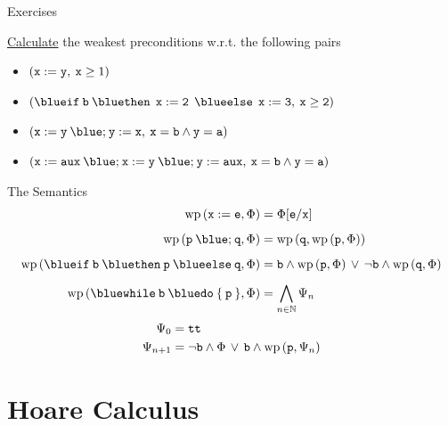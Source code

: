 \documentclass{beamer}
\begin{document}
\begin{frame}{Exercises}
        
        \alert{\underline{Calculate}} the weakest preconditions w.r.t. the following pairs
        \\[7pt]
        \begin{itemize}
                \item $(\mathtt{x := y}, \>  \mathtt{x} \geq 1)$
                        \\[7pt]
                \item $(\prog{{\blue if} \>  b \> {\blue then} \> \> 
                        x:=2 \> \> {\blue else} \> \> x:= 3}, \> \prog{x \geq 2})$
                        \\[7pt]
                \item $(\prog{x:= y \> {\blue ;} \> y := x}, \> \prog{ x = b \wedge y = a })$
                        \\[7pt]
                \item $(\prog{x:= aux \> {\blue ;} \> 
                        x:= y \> {\blue ;} \> y := aux}, \> \prog{ x = b \wedge y = a })$
        \end{itemize}
\end{frame}

\begin{frame}{The Semantics}
        \begin{align*}
                \mathrm{wp}\,(\prog{x : = e}, \Phi) & = \Phi[\prog{e}/\prog{x}] \\[5pt]
                \mathrm{wp}\,(\prog{p} \> {\blue ;} \> \prog{q}, \Phi) & 
                = \mathrm{wp} \, (\prog{q}, \mathrm{wp} \, (\prog{p}, \Phi))  \\[5pt]
                \mathrm{wp}\,({\mathtt{{\blue if} \> b \> {\blue then} \> p \> {\blue else} \> q}}, \Phi)
                & 
                =
                \prog{b} \wedge \mathrm{wp}\, (\prog{p},\Phi) \, \vee \,
                \prog{\neg b} \wedge \mathrm{wp} \, (\prog{q}, \Phi)
                \\[5pt]
                \mathrm{wp} \, ({\mathtt{{\blue while} \> b \> {\blue do} \> \{ \> p \> \}} }, \Phi)
                & = \bigwedge_{n \in \Nats} \Psi_n
        \end{align*}
        \pause
        \vspace{-0.5cm}
        \begin{align*}
                \Psi_0 & = \mathtt{tt} \\
                \Psi_{n+1} & = \neg \mathtt{b} \wedge \Phi \, \vee \, \mathtt{b} \wedge 
                \mathrm{wp} \, (\mathtt{p}, \Psi_n)
        \end{align*}
\end{frame}


\section{Hoare Calculus}



\end{document}
